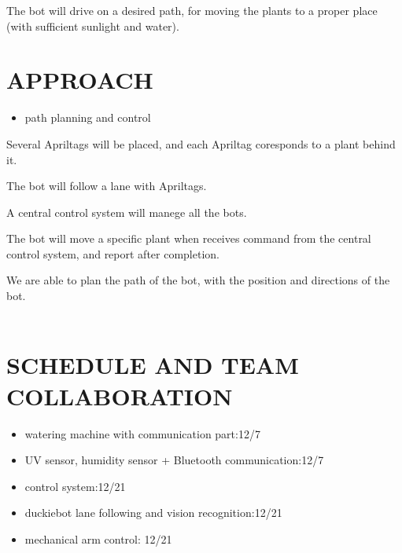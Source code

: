 \documentclass[a4paper, 10pt, conference]{ieeeconf}      %
\begin{document}
The bot will drive on a desired path, for moving the plants to a proper place (with sufficient sunlight and water).\\

\section{APPROACH}

\begin{itemize}
\item path planning and control
\end{itemize}


Several Apriltags will be placed, and each Apriltag coresponds to a plant behind it.

The bot will follow a lane with Apriltags.

A central control system will manege all the bots.

The bot will move a specific plant when receives command from the central control system, and report after completion.

We are able to plan the path of the bot, with the position and directions of the bot.\\\\

\section{SCHEDULE AND TEAM COLLABORATION}

\begin{itemize}
\item watering machine with communication part:12/7
\item UV sensor, humidity sensor + Bluetooth communication:12/7
\item control system:12/21
\item duckiebot lane following and vision recognition:12/21
\item mechanical arm control: 12/21
\end{itemize}
   

\addtolength{\textheight}{-12cm}   %



\end{document}
